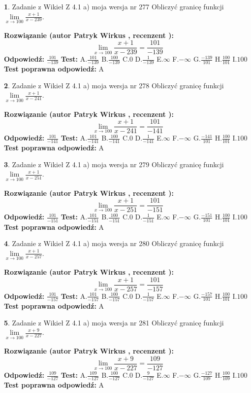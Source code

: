 \documentclass[12pt, a4paper]{article}
\theoremstyle{definition} %
\newtheorem{zad}{}
\newcommand{\zadStart}[1]{\begin{zad}#1\newline}
\newcommand{\zadStop}{\end{zad}}
\newcommand{\rozwStart}[2]{\noindent \textbf{Rozwiązanie (autor #1 , recenzent #2): }\newline}
\newcommand{\rozwStop}{\newline}
\newcommand{\odpStart}{\noindent \textbf{Odpowiedź:}\newline}
\newcommand{\odpStop}{\newline}
\newcommand{\testStart}{\noindent \textbf{Test:}\newline}
\newcommand{\testStop}{\newline}
\newcommand{\kluczStart}{\noindent \textbf{Test poprawna odpowiedź:}\newline}
\newcommand{\kluczStop}{\newline}
\begin{document}
\zadStart{Zadanie z Wikieł Z 4.1 a) moja wersja nr 277}
Obliczyć granicę funkcji $\lim\limits_{x\to100}\frac{x+1}{x-239}$.
\zadStop
\rozwStart{Patryk Wirkus}{}
$$\lim\limits_{x\to100}\frac{x+1}{x-239} = \frac{101}{-139}$$
\rozwStop
\odpStart
$\frac{101}{-139}$
\odpStop
\testStart
A.$\frac{101}{-139}$
B.$\frac{100}{-139}$
C.$0$
D.$\frac{1}{-139}$
E.$\infty$
F.$-\infty$
G.$\frac{-139}{101}$
H.$\frac{100}{101}$
I.$100$
\testStop
\kluczStart
A
\kluczStop



\zadStart{Zadanie z Wikieł Z 4.1 a) moja wersja nr 278}
Obliczyć granicę funkcji $\lim\limits_{x\to100}\frac{x+1}{x-241}$.
\zadStop
\rozwStart{Patryk Wirkus}{}
$$\lim\limits_{x\to100}\frac{x+1}{x-241} = \frac{101}{-141}$$
\rozwStop
\odpStart
$\frac{101}{-141}$
\odpStop
\testStart
A.$\frac{101}{-141}$
B.$\frac{100}{-141}$
C.$0$
D.$\frac{1}{-141}$
E.$\infty$
F.$-\infty$
G.$\frac{-141}{101}$
H.$\frac{100}{101}$
I.$100$
\testStop
\kluczStart
A
\kluczStop



\zadStart{Zadanie z Wikieł Z 4.1 a) moja wersja nr 279}
Obliczyć granicę funkcji $\lim\limits_{x\to100}\frac{x+1}{x-251}$.
\zadStop
\rozwStart{Patryk Wirkus}{}
$$\lim\limits_{x\to100}\frac{x+1}{x-251} = \frac{101}{-151}$$
\rozwStop
\odpStart
$\frac{101}{-151}$
\odpStop
\testStart
A.$\frac{101}{-151}$
B.$\frac{100}{-151}$
C.$0$
D.$\frac{1}{-151}$
E.$\infty$
F.$-\infty$
G.$\frac{-151}{101}$
H.$\frac{100}{101}$
I.$100$
\testStop
\kluczStart
A
\kluczStop



\zadStart{Zadanie z Wikieł Z 4.1 a) moja wersja nr 280}
Obliczyć granicę funkcji $\lim\limits_{x\to100}\frac{x+1}{x-257}$.
\zadStop
\rozwStart{Patryk Wirkus}{}
$$\lim\limits_{x\to100}\frac{x+1}{x-257} = \frac{101}{-157}$$
\rozwStop
\odpStart
$\frac{101}{-157}$
\odpStop
\testStart
A.$\frac{101}{-157}$
B.$\frac{100}{-157}$
C.$0$
D.$\frac{1}{-157}$
E.$\infty$
F.$-\infty$
G.$\frac{-157}{101}$
H.$\frac{100}{101}$
I.$100$
\testStop
\kluczStart
A
\kluczStop



\zadStart{Zadanie z Wikieł Z 4.1 a) moja wersja nr 281}
Obliczyć granicę funkcji $\lim\limits_{x\to100}\frac{x+9}{x-227}$.
\zadStop
\rozwStart{Patryk Wirkus}{}
$$\lim\limits_{x\to100}\frac{x+9}{x-227} = \frac{109}{-127}$$
\rozwStop
\odpStart
$\frac{109}{-127}$
\odpStop
\testStart
A.$\frac{109}{-127}$
B.$\frac{100}{-127}$
C.$0$
D.$\frac{9}{-127}$
E.$\infty$
F.$-\infty$
G.$\frac{-127}{109}$
H.$\frac{100}{109}$
I.$100$
\testStop
\kluczStart
A
\kluczStop
\end{document}
